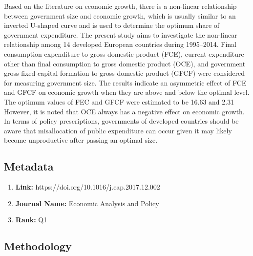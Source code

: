 \documentclass[10pt, oneside]{article}
\begin{document}
Based on the literature on economic growth, there is a non-linear relationship between
government size and economic growth, which is usually similar to an inverted U-shaped
curve and is used to determine the optimum share of government expenditure. The present
study aims to investigate the non-linear relationship among 14 developed European
countries during 1995–2014. Final consumption expenditure to gross domestic product
(FCE), current expenditure other than final consumption to gross domestic product (OCE),
and government gross fixed capital formation to gross domestic product (GFCF) were
considered for measuring government size. The results indicate an asymmetric effect of
FCE and GFCF on economic growth when they are above and below the optimal level.
The optimum values of FEC and GFCF were estimated to be 16.63 and 2.31%
However, it is noted that OCE always has a negative effect on economic growth. In
terms of policy prescriptions, governments of developed countries should be aware that
misallocation of public expenditure can occur given it may likely become unproductive
after passing an optimal size. \cite{Hajamini2018EconomicGA}

\subsection{Metadata}
\begin{enumerate}
	\item \textbf{Link:} https://doi.org/10.1016/j.eap.2017.12.002
	\item \textbf{Journal Name:} Economic Analysis and Policy
	\item \textbf{Rank:} Q1
\end{enumerate}

\subsection{Methodology}
\end{document}
